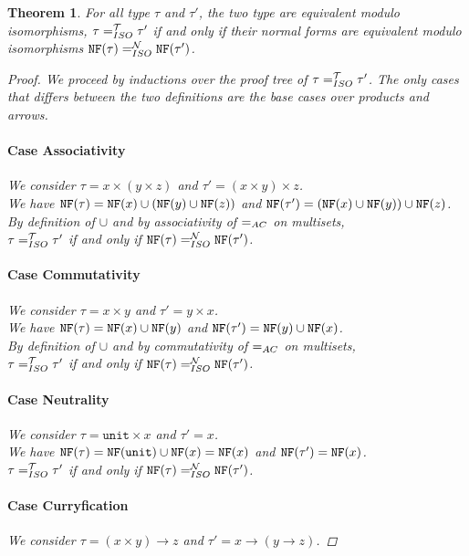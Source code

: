 \documentclass [a4paper,11pt]{scrartcl}
\newtheorem{theorem}{Theorem}[subsection]
\newcommand\tprod{\times}
\begin{document}
\begin{theorem}
For all type $\tau$ and $\tau'$, the two type are equivalent modulo isomorphisms, $\tau =^{{\cal T}}_{ISO} \tau'$ if and only if their normal forms are equivalent modulo isomorphisms $\texttt{NF}(\tau) =^{{\cal N}}_{ISO} \texttt{NF}(\tau')$.

\begin{proof}
We proceed by inductions over the proof tree of $\tau =^{{\cal T}}_{ISO} \tau'$.
The only cases that differs between the two definitions
are the base cases over products and arrows.

\paragraph{Case Associativity}
We consider $\tau = x \tprod (y \tprod z)$ and $\tau' = (x \tprod y) \tprod z$.\\
We have $\texttt{NF}(\tau) = \texttt{NF}(x) \cup (\texttt{NF}(y) \cup \texttt{NF}(z))$ and $\texttt{NF}(\tau') = (\texttt{NF}(x) \cup \texttt{NF}(y)) \cup \texttt{NF}(z)$.\\
By definition of $\cup$ and by associativity of $=_{AC}$ on multisets,\\
$\tau =^{{\cal T}}_{ISO} \tau'$ if and only if $\texttt{NF}(\tau) =^{{\cal N}}_{ISO} \texttt{NF}(\tau')$.

\paragraph{Case Commutativity}
We consider $\tau = x \tprod y$ and $\tau' = y \tprod x$.\\
We have $\texttt{NF}(\tau) = \texttt{NF}(x) \cup \texttt{NF}(y)$ and $\texttt{NF}(\tau') = \texttt{NF}(y) \cup \texttt{NF}(x)$.\\
By definition of $\cup$ and by commutativity of $=_{AC}$ on multisets,\\
$\tau =^{{\cal T}}_{ISO} \tau'$ if and only if $\texttt{NF}(\tau) =^{{\cal N}}_{ISO} \texttt{NF}(\tau')$.

\paragraph{Case Neutrality}
We consider $\tau = \texttt{unit} \tprod x$ and $\tau' = x$.\\
We have $\texttt{NF}(\tau) = \texttt{NF}(\texttt{unit}) \cup \texttt{NF}(x) = \texttt{NF}(x)$ and $\texttt{NF}(\tau') = \texttt{NF}(x)$.\\
$\tau =^{{\cal T}}_{ISO} \tau'$ if and only if $\texttt{NF}(\tau) =^{{\cal N}}_{ISO} \texttt{NF}(\tau')$.

\paragraph{Case Curryfication}
We consider $\tau = (x \tprod y) \to z$ and $\tau' = x \to (y \to z)$.


\end{proof}
\end{theorem}
\end{document}
